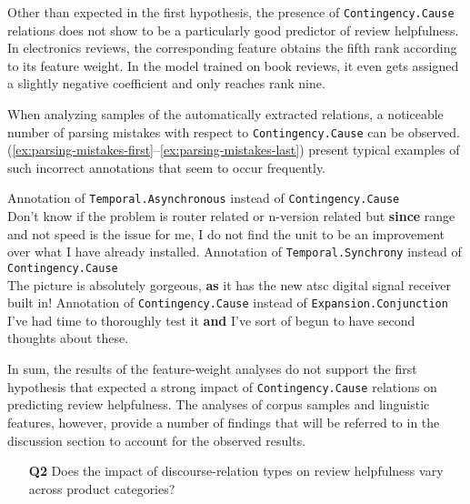 \documentclass[
    a4paper,%
    12pt,%
    oneside,%
    toc=bibliography,
    final,
]{scrartcl}
\begin{document}
Other than expected in the first hypothesis, the presence of \lstinline|Contingency.Cause| relations does not show to be a particularly good predictor of review helpfulness. In electronics reviews, the corresponding feature obtains the fifth rank according to its feature weight. In the model trained on book reviews, it even gets assigned a slightly negative coefficient and only reaches rank nine.

When analyzing samples of the automatically extracted relations, a noticeable number of parsing mistakes with respect to \lstinline|Contingency.Cause| can be observed. (\ref{ex:parsing-mistakes-first}–\ref{ex:parsing-mistakes-last}) present typical examples of such incorrect annotations that seem to occur frequently.

\begin{exe}
\ex \label{ex:parsing-mistakes-first} Annotation of \lstinline|Temporal.Asynchronous| instead of \lstinline|Contingency.Cause|\\
Don't know if the problem is router related or n-version related but \textbf{since} range and not speed is the issue for me, I do not find the unit to be an improvement over what I have already installed.
\ex Annotation of \lstinline|Temporal.Synchrony| instead of \lstinline|Contingency.Cause|\\
The picture is absolutely gorgeous, \textbf{as} it has the new atsc digital signal receiver built in!
\ex \label{ex:parsing-mistakes-last} Annotation of \lstinline|Contingency.Cause| instead of \lstinline|Expansion.Conjunction|\\
I've had time to thoroughly test it \textbf{and} I've sort of begun to have second thoughts about these.
\end{exe}

In sum, the results of the feature-weight analyses do not support the first hypothesis that expected a strong impact of \lstinline|Contingency.Cause| relations on predicting review helpfulness. The analyses of corpus samples and linguistic features, however, provide a number of findings that will be referred to in the discussion section to account for the observed results.


\begin{enumerate}[rightmargin=1cm]
\item[\textbf{Q2}] Does the impact of discourse-relation types on review helpfulness vary across product categories?
\end{enumerate}
\end{document}
